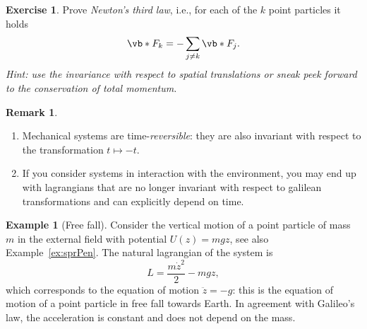 \documentclass[english,fontsize=11pt,paper=b5]{scrbook}
\theoremstyle{definition}
\newtheorem{remark}{Remark}[chapter]
\newtheorem{example}{Example}[chapter]
\newtheorem{exercise}{Exercise}[chapter]
\begin{document}
    \begin{exercise}\label{ex:N3l1}
      Prove \emph{Newton's third law}, i.e., for each of the $k$ point particles it holds
      \begin{equation}
        \vb*{F}_k = -\sum_{j\neq k} \vb*{F}_j.
      \end{equation}
      \textit{Hint: use the invariance with respect to spatial translations or sneak peek forward to the conservation of total momentum.}
    \end{exercise}

    \begin{remark}
      \begin{enumerate}
        \item Mechanical systems are time-\emph{reversible}: they are also invariant with respect to the transformation $t\mapsto -t$.
        \item If you consider systems in interaction with the environment, you may end up with lagrangians that are no longer invariant with respect to galilean transformations and can explicitly depend on time.
      \end{enumerate}
    \end{remark}

    \begin{example}[Free fall]
      Consider the vertical motion of a point particle of mass $m$ in the external field with potential $U(z) = m g z$, see also Example~\ref{ex:sprPen}. The natural lagrangian of the system is
      \begin{equation}
        L = \frac{m\dot z^2}2 - mgz,
      \end{equation}
      which corresponds to the equation of motion $\ddot z = -g$: this is the equation of motion of a point particle in free fall towards Earth. In agreement with Galileo's law, the acceleration is constant and does not depend on the mass.
    \end{example}
\end{document}
